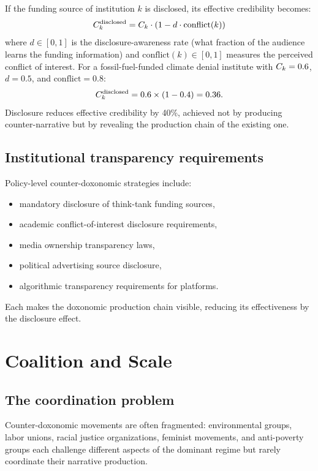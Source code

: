 \begin{proposition}
\label{prop:disclosure}
If the funding source of institution $k$ is disclosed, its effective credibility becomes:
\[
  C_{k}^{\text{disclosed}} = C_{k} \cdot (1 - d \cdot \text{conflict}(k))
\]
where $d \in [0, 1]$ is the disclosure-awareness rate (what fraction of the audience learns the funding information) and $\text{conflict}(k) \in [0, 1]$ measures the perceived conflict of interest.
For a fossil-fuel-funded climate denial institute with $C_{k} = 0.6$, $d = 0.5$, and $\text{conflict} = 0.8$:
\[
  C_{k}^{\text{disclosed}} = 0.6 \times (1 - 0.4) = 0.36.
\]
Disclosure reduces effective credibility by 40\%, achieved not by producing counter-narrative but by revealing the production chain of the existing one.
\end{proposition}

\subsection{Institutional transparency requirements}

Policy-level counter-doxonomic strategies include:
\begin{itemize}[nosep]
  \item mandatory disclosure of think-tank funding sources,
  \item academic conflict-of-interest disclosure requirements,
  \item media ownership transparency laws,
  \item political advertising source disclosure,
  \item algorithmic transparency requirements for platforms.
\end{itemize}

Each makes the doxonomic production chain visible, reducing its effectiveness by the disclosure effect.

\section{Coalition and Scale}
\label{sec:ch31-coalition}

\subsection{The coordination problem}

Counter-doxonomic movements are often fragmented: environmental groups, labor unions, racial justice organizations, feminist movements, and anti-poverty groups each challenge different aspects of the dominant regime but rarely coordinate their narrative production.

